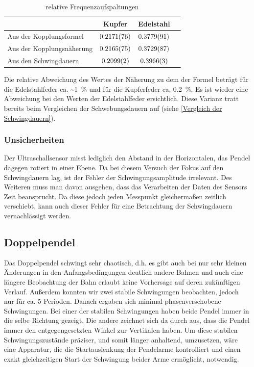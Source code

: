 \documentclass[
	a4paper,
	12pt,
	pagesize,
	ngerman
]{scrartcl}
\begin{document}
	\begin{table}[H]
	\centering
	\begin{tabular}{ l | c | c | c |}
		& Kupfer & Edelstahl  \\ \hline
		Aus der Kopplungsformel   &$\SI{0,2171 \pm 0,0076}{}$&$\SI{0,3779 \pm 0,0091}{}$\\  \hline
		Aus der Kopplungsnäherung   &$\SI{0,2165 \pm 0,0075}{}$&$\SI{0,3729 \pm 0,0087}{}$\\  \hline
		Aus den Schwingdauern   &$\SI{0,2099 \pm 0,0002}{}$&$\SI{0,3966 \pm 0,0003}{}$\\  \hline
	\end{tabular}
	\caption{relative Frequenzaufspaltungen}
	\end{table}
	\noindent{}Die relative Abweichung des Wertes der Näherung zu dem der Formel beträgt für die Edelstahlfeder ca. \SI{~1}{\%} und für die Kupferfeder ca. \SI{0,2}{\%}.
	Es ist wieder eine Abweichung bei den Werten der Edelstahlfeder ersichtlich. Diese Varianz tratt bereits beim Vergleichen der Schwebungsdauern auf (siehe \cref{Vergleich der Schwingdauern}).


	
	\subsubsection*{Unsicherheiten}
	Der Ultraschallsensor misst lediglich den Abstand in der Horizontalen, das Pendel dagegen rotiert in einer Ebene. Da bei diesem Versuch der Fokus auf den Schwingdauern lag, ist der Fehler der Schwingungsamplitude irrelevant. Des Weiteren muss man davon ausgehen, dass das Verarbeiten der Daten des Sensors Zeit beansprucht. Da diese jedoch jeden Messpunkt gleichermaßen zeitlich verschiebt, kann auch dieser Fehler für eine Betrachtung der Schwingdauern vernachlässigt werden.
	
	


	\subsection{Doppelpendel}
	Das Doppelpendel schwingt sehr chaotisch, d.h. es gibt auch bei nur sehr kleinen Änderungen in den Anfangsbedingungen deutlich andere Bahnen und auch eine längere Beobachtung der Bahn erlaubt keine Vorhersage auf deren zukünftigen Verlauf. Außerdem konnten wir zwei stabile Schwingungen beobachten, jedoch nur für ca. 5 Perioden. Danach ergaben sich minimal phasenverschobene Schwingungen. Bei einer der stabilen Schwingungen haben beide Pendel immer in die selbe Richtung gezeigt. Die andere zeichnet sich da durch aus, dass die Pendel immer den entgegengesetzten Winkel zur Vertikalen haben. Um diese stabilen Schwingungszustände präziser, und somit länger anhaltend, umzusetzen, wäre eine Apparatur, die die Startauslenkung der Pendelarme kontrolliert und einen exakt gleichzeitigen Start der Schwingung beider Arme ermöglicht, notwendig.%
\end{document}
